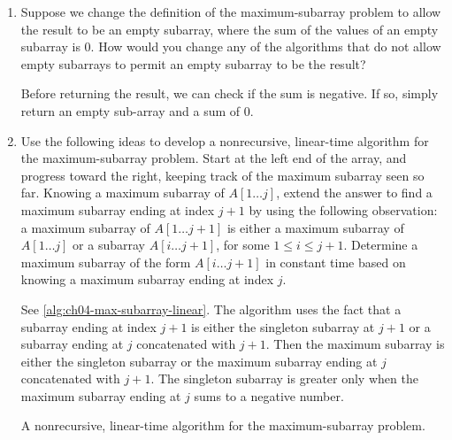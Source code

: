 \documentclass[Chapter04]{subfiles}
\begin{document}
\begin{enumerate}
\begin{answer}
		\end{answer}

		\item Suppose we change the definition of the maximum-subarray problem to allow the result to be an empty subarray, where the sum of the values of an empty subarray is $0$. How would you change any of the algorithms that do not allow empty subarrays to permit an empty subarray to be the result?
		\begin{answer}
			Before returning the result, we can check if the sum is negative. If so, simply return an empty sub-array and a sum of 0.
		\end{answer}

		\item Use the following ideas to develop a nonrecursive, linear-time algorithm for the maximum-subarray problem. Start at the left end of the array, and progress toward the right, keeping track of the maximum subarray seen so far. Knowing a maximum subarray of $A[1 \dots j]$, extend the answer to find a maximum subarray ending at index $j + 1$ by using the following observation: a maximum subarray of $A[1 \dots j + 1]$ is either a maximum subarray of $A[1 \dots j]$ or a subarray $A[i \dots j + 1]$, for some $1 \leq i \leq j + 1$. Determine a maximum subarray of the form $A[i \dots j + 1]$ in constant time based on knowing a maximum subarray ending at index $j$.
		\begin{answer}
			See \cref{alg:ch04-max-subarray-linear}. The algorithm uses the fact that a subarray ending at index $j + 1$ is either the singleton subarray at $j + 1$ or a subarray ending at $j$ concatenated with $j + 1$. Then the maximum subarray is either the singleton subarray or the maximum subarray ending at $j$ concatenated with $j + 1$. The singleton subarray is greater only when the maximum subarray ending at $j$ sums to a negative number.

			\begin{algorithm}[H]
				\caption{A nonrecursive, linear-time algorithm for the maximum-subarray problem.}
				\label{alg:ch04-max-subarray-linear}

			\end{algorithm}
		\end{answer}

	\end{enumerate}
\end{document}
